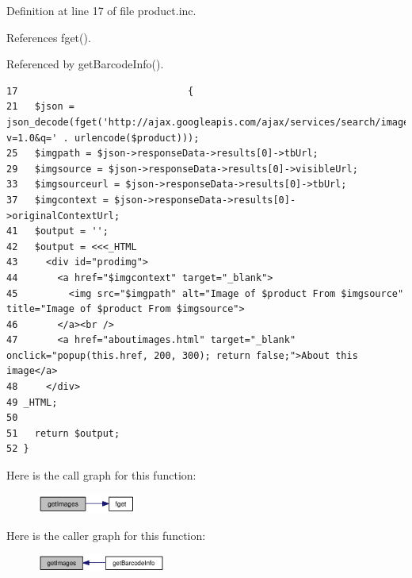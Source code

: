 Definition at line 17 of file product.inc.

References fget().

Referenced by getBarcodeInfo().

\begin{Code}\begin{verbatim}17                              {
21   $json = json_decode(fget('http://ajax.googleapis.com/ajax/services/search/images?v=1.0&q=' . urlencode($product)));
25   $imgpath = $json->responseData->results[0]->tbUrl;
29   $imgsource = $json->responseData->results[0]->visibleUrl;
33   $imgsourceurl = $json->responseData->results[0]->tbUrl;
37   $imgcontext = $json->responseData->results[0]->originalContextUrl;
41   $output = '';
42   $output = <<<_HTML
43     <div id="prodimg">
44       <a href="$imgcontext" target="_blank">
45         <img src="$imgpath" alt="Image of $product From $imgsource" title="Image of $product From $imgsource">
46       </a><br />
47       <a href="aboutimages.html" target="_blank" onclick="popup(this.href, 200, 300); return false;">About this image</a>
48     </div>
49 _HTML;
50 
51   return $output;
52 }
\end{verbatim}
\end{Code}




Here is the call graph for this function:\nopagebreak
\begin{figure}[H]
\begin{center}
\leavevmode
\includegraphics[width=92pt]{product_8inc_9dbb778854cfe105058d7161ca8f058c_cgraph}
\end{center}
\end{figure}


Here is the caller graph for this function:\nopagebreak
\begin{figure}[H]
\begin{center}
\leavevmode
\includegraphics[width=120pt]{product_8inc_9dbb778854cfe105058d7161ca8f058c_icgraph}
\end{center}
\end{figure}
